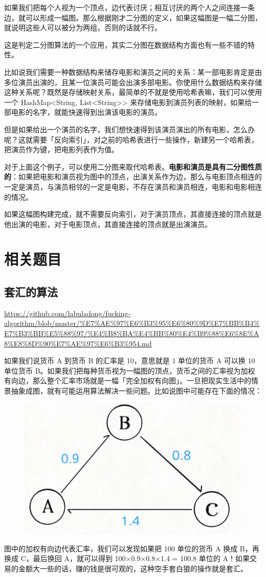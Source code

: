 \documentclass[12pt]{article}
\begin{document}
如果我们把每个人视为一个顶点，边代表讨厌；相互讨厌的两个人之间连接一条边，就可以形成一幅图。那么根据刚才二分图的定义，如果这幅图是一幅二分图，就说明这些人可以被分为两组，否则的话就不行。

这是判定二分图算法的一个应用，其实二分图在数据结构方面也有一些不错的特性。

比如说我们需要一种数据结构来储存电影和演员之间的关系：某一部电影肯定是由多位演员出演的，且某一位演员可能会出演多部电影。你使用什么数据结构来存储这种关系呢？既然是存储映射关系，最简单的不就是使用哈希表嘛，我们可以使用一个 HashMap<String, List<String>> 来存储电影到演员列表的映射，如果给一部电影的名字，就能快速得到出演该电影的演员。

但是如果给出一个演员的名字，我们想快速得到该演员演出的所有电影，怎么办呢？这就需要「反向索引」，对之前的哈希表进行一些操作，新建另一个哈希表，把演员作为键，把电影列表作为值。

对于上面这个例子，可以使用二分图来取代哈希表。\textbf{电影和演员是具有二分图性质的}：如果把电影和演员视为图中的顶点，出演关系作为边，那么与电影顶点相连的一定是演员，与演员相邻的一定是电影，不存在演员和演员相连，电影和电影相连的情况。

如果这幅图构建完成，就不需要反向索引，对于演员顶点，其直接连接的顶点就是他出演的电影，对于电影顶点，其直接连接的顶点就是出演演员。


\section{相关题目}
\subsection{套汇的算法}
\url{https://github.com/labuladong/fucking-algorithm/blob/master/%E7%AE%97%E6%B3%95%E6%80%9D%E7%BB%B4%E7%B3%BB%E5%88%97/%E4%B8%BA%E4%BB%80%E4%B9%88%E6%8E%A8%E8%8D%90%E7%AE%97%E6%B3%954.md}

如果我们说货币 A 到货币 B 的汇率是 10，意思就是 1 单位的货币 A 可以换 10 单位货币 B。如果我们把每种货币视为一幅图的顶点，货币之间的汇率视为加权有向边，那么整个汇率市场就是一幅「完全加权有向图」。一旦把现实生活中的情景抽象成图，就有可能运用算法解决一些问题。比如说图中可能存在下面的情况：
\begin{figure}[H]
    \centering
    \includegraphics[width=.5\textwidth]{fig/FA_Graph_Problem_1.png}
\end{figure}
图中的加权有向边代表汇率，我们可以发现如果把 100 单位的货币 A 换成 B，再换成 C，最后换回 A，就可以得到 100×0.9×0.8×1.4 = 100.8 单位的 A！如果交易的金额大一些的话，赚的钱是很可观的，这种空手套白狼的操作就是套汇。
\end{document}
